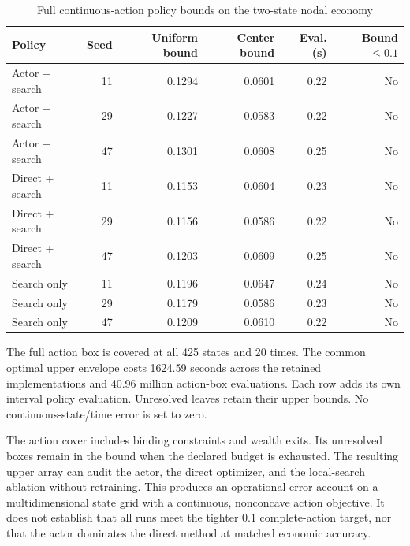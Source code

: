 \begin{table}[htbp]\centering
\caption{Full continuous-action policy bounds on the two-state nodal economy}
\begin{small}\begin{tabular}{lrrrrr}
\toprule
Policy & Seed & Uniform bound & Center bound & Eval. (s) & Bound $\leq 0.1$ \\
\midrule
Actor + search & 11 & 0.1294 & 0.0601 & 0.22 & No \\
Actor + search & 29 & 0.1227 & 0.0583 & 0.22 & No \\
Actor + search & 47 & 0.1301 & 0.0608 & 0.25 & No \\
Direct + search & 11 & 0.1153 & 0.0604 & 0.23 & No \\
Direct + search & 29 & 0.1156 & 0.0586 & 0.22 & No \\
Direct + search & 47 & 0.1203 & 0.0609 & 0.25 & No \\
Search only & 11 & 0.1196 & 0.0647 & 0.24 & No \\
Search only & 29 & 0.1179 & 0.0586 & 0.23 & No \\
Search only & 47 & 0.1209 & 0.0610 & 0.22 & No \\
\bottomrule\end{tabular}\end{small}
\par\smallskip\begin{minipage}{0.96\linewidth}\footnotesize The full action box is covered at all 425 states and 20 times. The common optimal upper envelope costs 1624.59 seconds across the retained implementations and 40.96 million action-box evaluations. Each row adds its own interval policy evaluation. Unresolved leaves retain their upper bounds. No continuous-state/time error is set to zero.\end{minipage}
\end{table}


The action cover includes binding constraints and wealth exits. Its unresolved boxes remain in the bound when the declared budget is exhausted. The resulting upper array can audit the actor, the direct optimizer, and the local-search ablation without retraining. This produces an operational error account on a multidimensional state grid with a continuous, nonconcave action objective. It does not establish that all runs meet the tighter $0.1$ complete-action target, nor that the actor dominates the direct method at matched economic accuracy.

